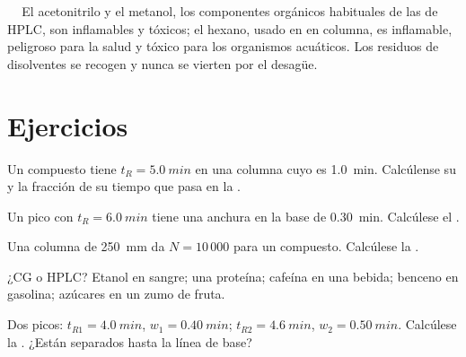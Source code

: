 \begin{safety}{\,\,\,\,\,}
El acetonitrilo y el metanol, los componentes orgánicos habituales de las  de HPLC, son inflamables y tóxicos;
el hexano, usado en  en columna, es inflamable, peligroso para la salud y tóxico para los organismos acuáticos.
Los residuos de disolventes se recogen y nunca se vierten por el desagüe.
\end{safety}

\section{Ejercicios}

\begin{exercise}[$\star$]\label{exo:b2:chromatography:1}
Un compuesto tiene $t_R = \qty{5.0}{min}$ en una columna cuyo  es \qty{1.0}{min}. Calcúlense su
 y la fracción de su tiempo que pasa en la .
\end{exercise}

\begin{exercise}[$\star$]\label{exo:b2:chromatography:2}
Un pico con $t_R = \qty{6.0}{min}$ tiene una anchura en la base de \qty{0.30}{min}. Calcúlese el .
\end{exercise}

\begin{exercise}[$\star$]\label{exo:b2:chromatography:3}
Una columna de \qty{250}{mm} da $N = 10\,000$ para un compuesto. Calcúlese la .
\end{exercise}

\begin{exercise}[$\star$]\label{exo:b2:chromatography:4}
¿CG o HPLC? Etanol en sangre; una proteína; cafeína en una bebida; benceno en gasolina; azúcares en un zumo de fruta.
\end{exercise}

\begin{exercise}[$\star\star$]\label{exo:b2:chromatography:5}
Dos picos: $t_{R1} = \qty{4.0}{min}$, $w_1 = \qty{0.40}{min}$; $t_{R2} = \qty{4.6}{min}$, $w_2 =
\qty{0.50}{min}$. Calcúlese la . ¿Están separados hasta la línea de base?
\end{exercise}

